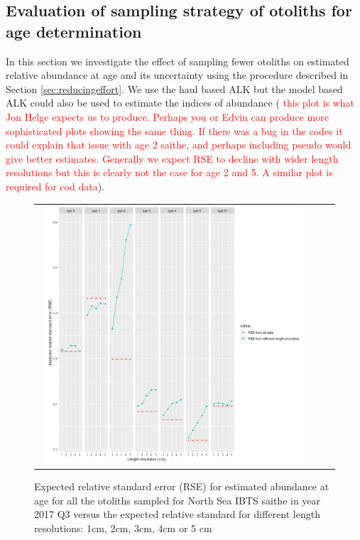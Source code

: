\documentclass[a4paper 12pt]{article}
\numberwithin{equation}{section}
\newcommand{\ed}[1]{\textcolor{red}{#1}}
\begin{document}
\clearpage
\subsection{Evaluation of sampling strategy of otoliths for age determination}
\label{sec:optimumeffortresults}
In this section we investigate the effect of sampling fewer otoliths on estimated relative abundance at age and its uncertainty using the procedure described in Section \ref{sec:reducingeffort}. We use the haul based ALK but the model based ALK could also be used to estimate the indices of abundance (\ed{ this plot is what Jon Helge expects us to produce. Perhaps you or Edvin can produce more sophisticated plots showing the same thing. If there was a bug in the codes it could explain that issue with age 2 saithe, and perhaps including pseudo would give better estimates. Generally we expect RSE to decline with wider length resolutions but this is clearly not the case for age 2 and 5. A similar plot is required for cod data}). 

\clearpage
\begin{figure}[h!]
\centering
\begin{tabular}{@{}ccc@{}}
{\includegraphics[width=0.95\textwidth]{figures/remavalSaitheHaul2017.jpeg}} & \\
\end{tabular}
\caption[]{Expected relative standard error (RSE) for estimated abundance at age for all the otoliths sampled for North Sea IBTS saithe in year 2017 Q3 versus the expected relative standard for different length resolutions: 1cm, 2cm, 3cm, 4cm or 5 cm}
\label{RemovalSaithe}
\end{figure} 
\end{document}

